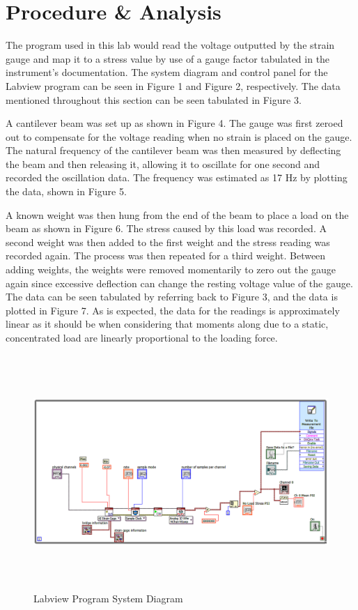 \documentclass[12pt]{article}
\begin{document}
\section*{\fontsize{12}{12}\selectfont \large Procedure \& Analysis}

The program used in this lab would read the voltage outputted by the strain gauge and map it to a stress value by use of a gauge factor tabulated in the instrument's documentation. The system diagram and control panel for the Labview program can be seen in Figure 1 and Figure 2, respectively. The data mentioned throughout this section can be seen tabulated in Figure 3. 
\bigskip

A cantilever beam was set up as shown in Figure 4. The gauge was first zeroed out to compensate for the voltage reading when no strain is placed on the gauge. The natural frequency of the cantilever beam was then measured by deflecting the beam and then releasing it, allowing it to oscillate for one second and recorded the oscillation data. The frequency was estimated as 17 Hz by plotting the data, shown in Figure 5.
\bigskip
 
A known weight was then hung from the end of the beam to place a load on the beam as shown in Figure 6. The stress caused by this load was recorded. A second weight was then added to the first weight and the stress reading was recorded again. The process was then repeated for a third weight. Between adding weights, the weights were removed momentarily to zero out the gauge again since excessive deflection can change the resting voltage value of the gauge. The data can be seen tabulated by referring back to Figure 3, and the data is plotted in Figure 7. As is expected, the data for the readings is approximately linear as it should be when considering that moments along due to a static, concentrated load are linearly proportional to the loading force.
\bigskip

\newpage

\begin{figure}[h!] %
   \centering
   \includegraphics[width=5.5in, height=3.5in]{lab10vi.png} 
   \caption{Labview Program System Diagram}
   \label{fig:example}
\end{figure}
\end{document}

